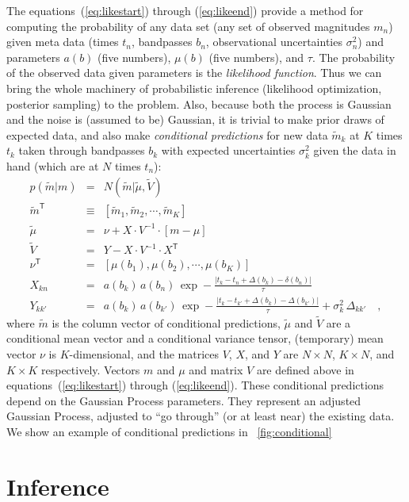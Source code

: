 \documentclass[letterpaper,12pt,preprint]{aastex}
\newcommand{\transpose}[1]{{#1}^{\mathsf{T}}}
\newcommand{\inverse}[1]{{#1}^{-1}}
\begin{document}
The equations~(\ref{eq:likestart}) through (\ref{eq:likeend})
provide a method for computing the probability of any data set (any
set of observed magnitudes $m_n$) given meta data (times $t_n$,
bandpasses $b_n$, observational uncertainties $\sigma_n^2$) and
parameters $a(b)$ (five numbers), $\mu(b)$ (five numbers), and $\tau$.
The probability of the observed data given parameters is the
\emph{likelihood function}.  Thus we can bring the whole machinery of
probabilistic inference (likelihood optimization, posterior sampling)
to the problem.  Also, because both the process is Gaussian and the
noise is (assumed to be) Gaussian, it is trivial to make prior draws
of expected data, and also make \emph{conditional predictions} for new
data $\tilde{m}_k$ at $K$ times $t_k$ taken through bandpasses $b_k$ with
expected uncertainties $\sigma_k^2$ given the data in hand (which are
at $N$ times $t_n$):
\begin{eqnarray}
p(\tilde{m}|m) &=& N(\tilde{m}|\tilde{\mu},\tilde{V})
\\
\transpose{\tilde{m}} &\equiv& [\tilde{m}_1, \tilde{m}_2, \cdots , \tilde{m}_K]
\\
\tilde{\mu} &=& \nu + X\cdot\inverse{V}\cdot [m - \mu]
\\
\tilde{V} &=& Y - X\cdot\inverse{V}\cdot\transpose{X}
\\
\transpose{\nu} &=& [\mu(b_1), \mu(b_2), \cdots , \mu(b_K)]
\\
X_{kn} &=& a(b_k)\,a(b_n)\,\exp -\frac{|t_k - t_n + \Delta(b_k) - \delta(b_n)|}{\tau}
\\
Y_{kk'} &=& a(b_k)\,a(b_{k'})\,\exp -\frac{|t_k - t_{k'}+\Delta(b_k) - \Delta(b_{k'})|}{\tau} + \sigma_k^2\,\Delta_{kk'}
\quad ,
\end{eqnarray}
where $\tilde{m}$ is the column vector of conditional predictions,
$\tilde{\mu}$ and $\tilde{V}$ are a conditional mean vector and a
conditional variance tensor, (temporary) mean vector $\nu$ is
$K$-dimensional, and the matrices $V$, $X$, and $Y$ are $N\times N$,
$K\times N$, and $K\times K$ respectively.  Vectors $m$ and $\mu$ and
matrix $V$ are defined above in equations~(\ref{eq:likestart}) through
(\ref{eq:likeend}).  These conditional predictions depend on the
Gaussian Process parameters.  They represent an adjusted Gaussian
Process, adjusted to ``go through'' (or at least near) the existing
data.  We show an example of conditional predictions in
\figurename~\ref{fig:conditional}

\section{Inference}
\end{document}
